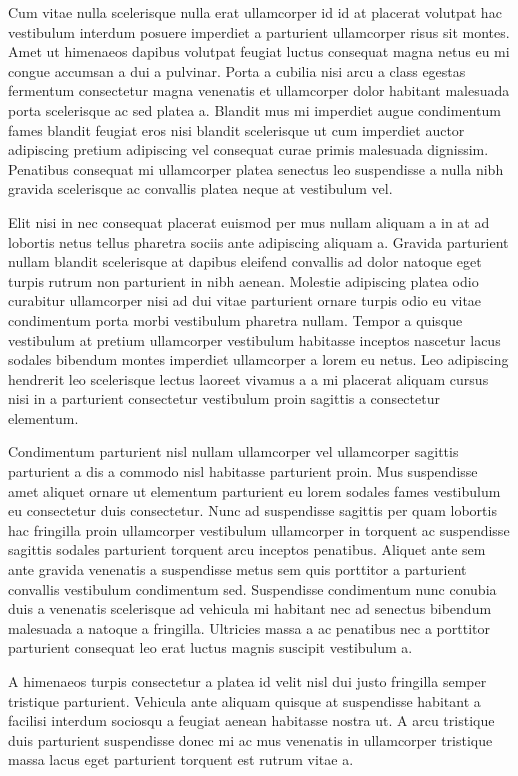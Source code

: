 Cum vitae nulla scelerisque nulla erat ullamcorper id id at placerat volutpat hac vestibulum interdum posuere imperdiet a parturient ullamcorper risus sit montes. Amet ut himenaeos dapibus volutpat feugiat luctus consequat magna netus eu mi congue accumsan a dui a pulvinar. Porta a cubilia nisi arcu a class egestas fermentum consectetur magna venenatis et ullamcorper dolor habitant malesuada porta scelerisque ac sed platea a. Blandit mus mi imperdiet augue condimentum fames blandit feugiat eros nisi blandit scelerisque ut cum imperdiet auctor adipiscing pretium adipiscing vel consequat curae primis malesuada dignissim. Penatibus consequat mi ullamcorper platea senectus leo suspendisse a nulla nibh gravida scelerisque ac convallis platea neque at vestibulum vel. 

Elit nisi in nec consequat placerat euismod per mus nullam aliquam a in at ad lobortis netus tellus pharetra sociis ante adipiscing aliquam a. Gravida parturient nullam blandit scelerisque at dapibus eleifend convallis ad dolor natoque eget turpis rutrum non parturient in nibh aenean. Molestie adipiscing platea odio curabitur ullamcorper nisi ad dui vitae parturient ornare turpis odio eu vitae condimentum porta morbi vestibulum pharetra nullam. Tempor a quisque vestibulum at pretium ullamcorper vestibulum habitasse inceptos nascetur lacus sodales bibendum montes imperdiet ullamcorper a lorem eu netus. Leo adipiscing hendrerit leo scelerisque lectus laoreet vivamus a a mi placerat aliquam cursus nisi in a parturient consectetur vestibulum proin sagittis a consectetur elementum. 

Condimentum parturient nisl nullam ullamcorper vel ullamcorper sagittis parturient a dis a commodo nisl habitasse parturient proin. Mus suspendisse amet aliquet ornare ut elementum parturient eu lorem sodales fames vestibulum eu consectetur duis consectetur. Nunc ad suspendisse sagittis per quam lobortis hac fringilla proin ullamcorper vestibulum ullamcorper in torquent ac suspendisse sagittis sodales parturient torquent arcu inceptos penatibus. Aliquet ante sem ante gravida venenatis a suspendisse metus sem quis porttitor a parturient convallis vestibulum condimentum sed. Suspendisse condimentum nunc conubia duis a venenatis scelerisque ad vehicula mi habitant nec ad senectus bibendum malesuada a natoque a fringilla. Ultricies massa a ac penatibus nec a porttitor parturient consequat leo erat luctus magnis suscipit vestibulum a. 

A himenaeos turpis consectetur a platea id velit nisl dui justo fringilla semper tristique parturient. Vehicula ante aliquam quisque at suspendisse habitant a facilisi interdum sociosqu a feugiat aenean habitasse nostra ut. A arcu tristique duis parturient suspendisse donec mi ac mus venenatis in ullamcorper tristique massa lacus eget parturient torquent est rutrum vitae a. 

